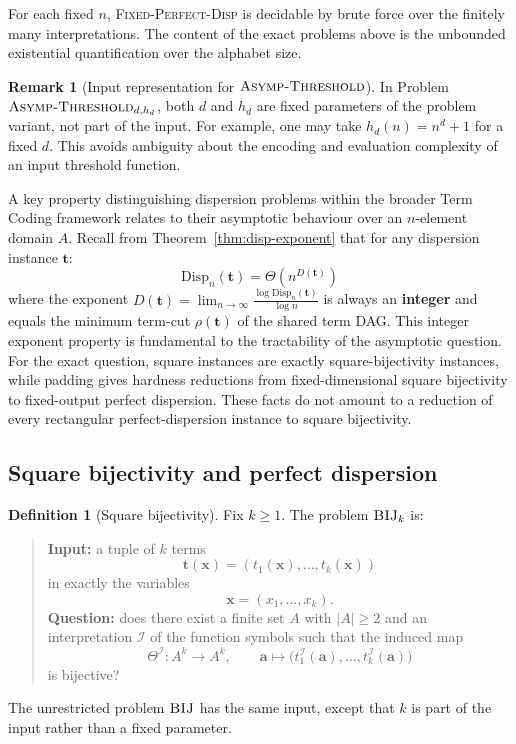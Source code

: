 \documentclass[11pt]{article}
\theoremstyle{definition}
\newtheorem{definition}{Definition}[section]
\newtheorem{remark}{Remark}[section]
\theoremstyle{plain}
\newcommand{\Disp}{\mathrm{Disp}}
\begin{document}
For each fixed $n$, \textsc{Fixed-Perfect-Disp} is decidable by brute force over the finitely many
interpretations.  The content of the exact problems above is the unbounded existential quantification over
the alphabet size.

\begin{remark}[Input representation for $\textsc{Asymp-Threshold}$]
In Problem $\textsc{Asymp-Threshold}_{d,h_d}$, both $d$ and $h_d$ are fixed parameters of the problem
variant, not part of the input. For example, one may take $h_d(n)=n^d+1$ for a fixed $d$. This avoids
ambiguity about the encoding and evaluation complexity of an input threshold function.
\end{remark}

A key property distinguishing dispersion problems within the broader Term Coding framework relates to their asymptotic behaviour over an $n$-element domain $A$.
Recall from Theorem~\ref{thm:disp-exponent} that for any dispersion instance $\mathbf t$:
\[
\Disp_n(\mathbf t) = \Theta\!\left(n^{D(\mathbf t)}\right)
\]
where the exponent $D(\mathbf t) = \lim_{n\to\infty} \frac{\log \Disp_n(\mathbf t)}{\log n}$ is always an
\textbf{integer} and equals the minimum term-cut $\rho(\mathbf t)$ of the shared term DAG.
This integer exponent property is fundamental to the tractability of the asymptotic question.
For the exact question, square instances are exactly square-bijectivity instances, while padding gives
hardness reductions from fixed-dimensional square bijectivity to fixed-output perfect dispersion.  These facts do
not amount to a reduction of every rectangular perfect-dispersion instance to square bijectivity.

\subsection{Square bijectivity and perfect dispersion}
\label{subsec:square-bijectivity}

\begin{definition}[Square bijectivity]
\label{def:bij3}
Fix $k\ge 1$.
The problem $\textsc{BIJ}_k$ is:
\begin{quote}
\textbf{Input:} a tuple of $k$ terms
\[
\mathbf t(\mathbf x)=(t_1(\mathbf x),\dots,t_k(\mathbf x))
\]
in exactly the variables
\[
\mathbf x=(x_1,\dots,x_k).
\]
\textbf{Question:} does there exist a finite set $A$ with $|A|\ge 2$ and an interpretation $\mathcal I$ of the
function symbols such that the induced map
\[
\Theta^\mathcal I:A^k\to A^k,\qquad
\mathbf a\mapsto \bigl(t_1^\mathcal I(\mathbf a),\dots,t_k^\mathcal I(\mathbf a)\bigr)
\]
is bijective?
\end{quote}
The unrestricted problem $\textsc{BIJ}$ has the same input, except that $k$ is part of the input rather than a
fixed parameter.
\end{definition}
\end{document}
